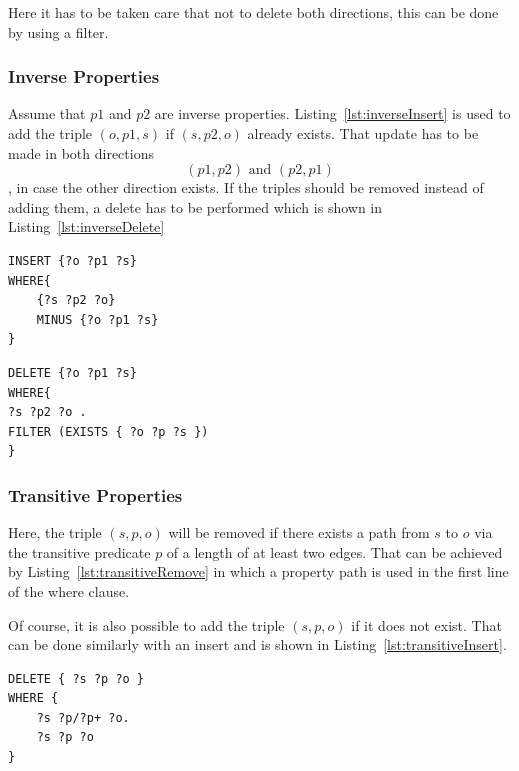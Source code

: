 Here it has to be taken care that not to delete both directions, this can be done by using a filter.

\subsubsection{Inverse Properties}

Assume that $ p1 $ and $ p2 $ are inverse properties. Listing~\ref{lst:inverseInsert} is used to add the triple $(o,p1,s)$ if $(s,p2,o)$ already exists. That update has to be made in both directions  
\[
(p1,p2) \text{ and } (p2,p1)
\]
, in case the other direction exists. If the triples should be removed instead of adding them, a delete has to be performed which is shown in Listing~\ref{lst:inverseDelete}

\begin{lstlisting}[captionpos=b, caption=SPARQL update for adding triples with the inverse properties p1 and p2., label=lst:inverseInsert,
basicstyle=\ttfamily,frame=single,float=hbt,]
INSERT {?o ?p1 ?s}
WHERE{
	{?s ?p2 ?o}
	MINUS {?o ?p1 ?s}
}
\end{lstlisting}



\begin{lstlisting}[captionpos=b, caption=SPARQL update for removing triples with the inverse properties p1 and p2., label=lst:inverseDelete,
basicstyle=\ttfamily,frame=single,float=hbt,]
DELETE {?o ?p1 ?s}
WHERE{
?s ?p2 ?o .
FILTER (EXISTS { ?o ?p ?s })
}
\end{lstlisting}

\subsubsection{Transitive Properties}

Here, the triple $(s,p,o)$ will be removed if there exists a path from $s$ to $o$ via the transitive predicate $p$ of a length of at least two edges. That can be achieved by Listing~\ref{lst:transitiveRemove} in which a property path is used in the first line of the where clause.

Of course, it is also possible to add the triple $(s,p,o)$ if it does not exist. That can be done similarly with an insert and is shown in Listing~\ref{lst:transitiveInsert}.

\begin{lstlisting}[captionpos=b, caption=SPARQL update for removing triples with the transitive property p., label=lst:transitiveRemove,
basicstyle=\ttfamily,frame=single,float=hbt,]
DELETE { ?s ?p ?o }
WHERE { 
	?s ?p/?p+ ?o. 
	?s ?p ?o 
}
\end{lstlisting}


